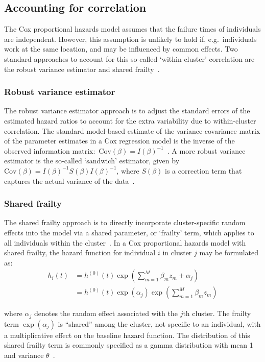 \subsection{Accounting for correlation}

The Cox proportional hazards model assumes that the failure times of individuals are independent. However, this assumption is unlikely to hold if, e.g.\ individuals work at the same location, and may be influenced by common effects. Two standard approaches to account for this so-called `within-cluster' correlation are the robust variance estimator and shared frailty~\parencite{Balan2020-gc}.

\subsubsection{Robust variance estimator}

The robust variance estimator approach is to adjust the standard errors of the estimated hazard ratios to account for the extra variability due to within-cluster correlation. The standard model-based estimate of the variance-covariance matrix of the parameter estimates in a Cox regression model is the inverse of the observed information matrix:\ $\text{Cov}(\beta) = {I(\beta)}^{-1}$~\parencite{Collett2023-bg}. A more robust variance estimator is the so-called `sandwich' estimator, given by $\text{Cov}(\beta) = {I(\beta)}^{-1} S(\beta) {I(\beta)}^{-1}$, where $S(\beta)$ is a correction term that captures the actual variance of the data~\parencite{Lin1989-ta}.

\subsubsection{Shared frailty}

The shared frailty approach is to directly incorporate cluster-specific random effects into the model via a shared parameter, or `frailty' term, which applies to all individuals within the cluster~\parencite{Austin2017-im}. In a Cox proportional hazards model with shared frailty, the hazard function for individual $i$ in cluster $j$ may be formulated as:
%
\begin{align*}
    h_i(t) & = h^{(0)}(t)\exp\left(\sum_{m=1}^{M}\beta_{m}z_{m}+ \alpha_j\right)     \\
           & = h^{(0)}(t)\exp(\alpha_j)\exp\left(\sum_{m=1}^{M}\beta_{m}z_{m}\right)
\end{align*}

where $\alpha_j$ denotes the random effect associated with the $j$th cluster. The frailty term $\exp(\alpha_j)$ is ``shared'' among the cluster, not specific to an individual, with a multiplicative effect on the baseline hazard function. The distribution of this shared frailty term is commonly specified as a gamma distribution with mean 1 and variance $\theta$~\parencite{Balan2020-gc}.

